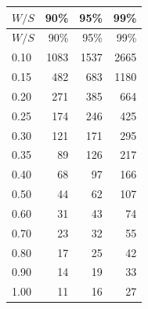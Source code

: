{\small\setlength{\tabcolsep}{4pt}
\begin{longtable}{lrrr}
\toprule $W/S$ & 90\% & 95\% & 99\%\\\midrule
\endfirsthead
\toprule $W/S$ & 90\% & 95\% & 99\%\\\midrule
\endhead
0.10 & 1083 & 1537 & 2665\\
0.15 & 482 & 683 & 1180\\
0.20 & 271 & 385 & 664\\
0.25 & 174 & 246 & 425\\
0.30 & 121 & 171 & 295\\
0.35 & 89 & 126 & 217\\
0.40 & 68 & 97 & 166\\
0.50 & 44 & 62 & 107\\
0.60 & 31 & 43 & 74\\
0.70 & 23 & 32 & 55\\
0.80 & 17 & 25 & 42\\
0.90 & 14 & 19 & 33\\
1.00 & 11 & 16 & 27\\\bottomrule
\end{longtable}}
